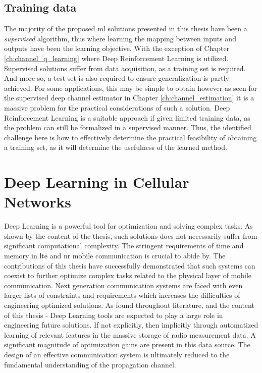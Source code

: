 \subsection{Training data}
The majority of the proposed \gls{ml} solutions presented in this thesis have been a \emph{supervised} algorithm, thus where learning the mapping between inputs and outputs have been the learning objective. With the exception of Chapter \ref{ch:channel_q_learning} where Deep Reinforcement Learning is utilized. Supervised solutions suffer from data acquisition, as a training set is required. And more so, a test set is also required to ensure generalization is partly achieved. For some applications, this may be simple to obtain however as seen for the supervised deep channel estimator in Chapter \ref{ch:channel_estimation} it is a massive problem for the practical considerations of such a solution. Deep Reinforcement Learning is a suitable approach if given limited training data, as the problem can still be formalized in a supervised manner. Thus, the identified challenge here is how to effectively determine the practical feasibility of obtaining a training set, as it will determine the usefulness of the learned method. 

\section{Deep Learning in Cellular Networks}

Deep Learning is a powerful tool for optimization and solving complex tasks. As shown by the content of the thesis, such solutions does not necessarily suffer from significant computational complexity. The stringent requirements of time and memory in \gls{lte} and \gls{nr} mobile communication is crucial to abide by. The contributions of this thesis have successfully demonstrated that such systems can coexist to further optimize complex tasks related to the physical layer of mobile communication. Next generation communication systems are faced with even larger lists of constraints and requirements which increases the difficulties of engineering optimized solutions. As found throughout literature, and the content of this thesis - Deep Learning tools are expected to play a large role in engineering future solutions. If not explicitly, then implicitly through automatized learning of relevant features in the massive storage of radio measurement data. A significant magnitude of optimization gains are present in this data source. The design of an effective communication system is ultimately reduced to the fundamental understanding of the propagation channel.

